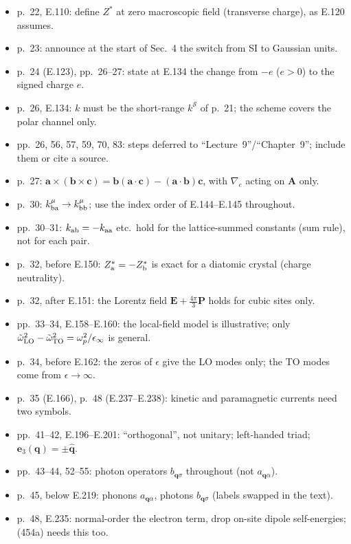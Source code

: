 \documentclass[11pt]{article}
\begin{document}
\begin{itemize}
\item p.~22, E.110: define $Z^*$ at zero macroscopic field (transverse charge), as E.120 assumes.
\item p.~23: announce at the start of Sec.~4 the switch from SI to Gaussian units.
\item p.~24 (E.123), pp.~26--27: state at E.134 the change from $-e$ ($e>0$) to the signed charge $e$.
\item p.~26, E.134: $k$ must be the short-range $k^{\mathcal S}$ of p.~21; the scheme covers the polar channel only.
\item pp.~26, 56, 57, 59, 70, 83: steps deferred to ``Lecture~9''/``Chapter~9''; include them or cite a source.
\item p.~27: $\mathbf a\times(\mathbf b\times\mathbf c)=\mathbf b(\mathbf a\cdot\mathbf c)-(\mathbf a\cdot\mathbf b)\mathbf c$, with $\nabla_e$ acting on $\mathbf A$ only.
\item p.~30: $k^\mu_{\rm ba}\to k^\mu_{\rm bb}$; use the index order of E.144--E.145 throughout.
\item pp.~30--31: $k_{\rm ab}=-k_{\rm aa}$ etc.\ hold for the lattice-summed constants (sum rule), not for each pair.
\item p.~32, before E.150: $Z^*_{\rm a}=-Z^*_{\rm b}$ is exact for a diatomic crystal (charge neutrality).
\item p.~32, after E.151: the Lorentz field $\mathbf E+\frac{4\pi}{3}\mathbf P$ holds for cubic sites only.
\item pp.~33--34, E.158--E.160: the local-field model is illustrative; only $\tilde\omega^2_{\rm LO}-\tilde\omega^2_{\rm TO}=\omega_p^2/\epsilon_\infty$ is general.
\item p.~34, before E.162: the zeros of $\epsilon$ give the LO modes only; the TO modes come from $\epsilon\to\infty$.
\item p.~35 (E.166), p.~48 (E.237--E.238): kinetic and paramagnetic currents need two symbols.
\item pp.~41--42, E.196--E.201: ``orthogonal'', not unitary; left-handed triad; $\mathbf e_3(\mathbf q)=\pm\hat{\mathbf q}$.
\item pp.~43--44, 52--55: photon operators $b_{\mathbf q\sigma}$ throughout (not $a_{\mathbf q\alpha}$).
\item p.~45, below E.219: phonons $a_{\mathbf q\alpha}$, photons $b_{\mathbf q\sigma}$ (labels swapped in the text).
\item p.~48, E.235: normal-order the electron term, drop on-site dipole self-energies; (454a) needs this too.

\end{itemize}
\end{document}
